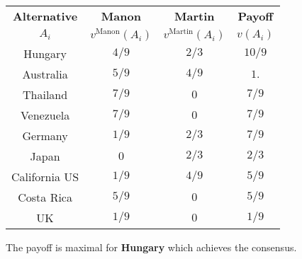 \documentclass[12pt,a4paper]{article}
\begin{document}
\begin{tabular}{|c|c|c|c|}
\hline
\textbf{Alternative}&\textbf{Manon}&\textbf{Martin}&\textbf{Payoff}\\
$A_i$ & $v^{\mathrm{Manon}}(A_i)$ & $v^{\mathrm{Martin}}(A_i)$ & $v(A_i)$ \\
\hline
Hungary & $4/9$ & $2/3$ & $10/9$ \\
Australia & $5/9$ & $4/9$ & $1.$ \\
Thailand & $7/9$ & $0$ & $7/9$ \\
Venezuela & $7/9$ & $0$ & $7/9$ \\
Germany & $1/9$ & $2/3$ & $7/9$ \\
Japan & $0$ & $2/3$ & $2/3$ \\
California US & $1/9$ & $4/9$ & $5/9$ \\
Costa Rica & $5/9$ & $0$ & $5/9$ \\
UK & $1/9$ & $0$ & $1/9$ \\
\hline
\end{tabular}

The payoff is maximal for \textbf{Hungary} which achieves the consensus.
\end{document}
